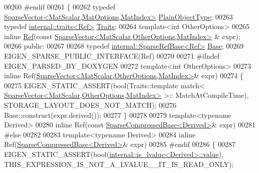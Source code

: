 \begin{DoxyCode}
00260 \textcolor{preprocessor}{#endif}
00261 \{
00262     \textcolor{keyword}{typedef} \hyperlink{group___sparse_core___module_class_eigen_1_1_sparse_vector}{SparseVector<MatScalar,MatOptions,MatIndex>} 
      \hyperlink{group___sparse_core___module_class_eigen_1_1_sparse_vector}{PlainObjectType};
00263     \textcolor{keyword}{typedef} \hyperlink{struct_eigen_1_1internal_1_1traits}{internal::traits<Ref>} \hyperlink{struct_eigen_1_1internal_1_1traits}{Traits};
00264     \textcolor{keyword}{template}<\textcolor{keywordtype}{int} OtherOptions>
00265     \textcolor{keyword}{inline} \hyperlink{group___core___module_class_eigen_1_1_ref}{Ref}(\textcolor{keyword}{const} \hyperlink{group___sparse_core___module_class_eigen_1_1_sparse_vector}{SparseVector<MatScalar,OtherOptions,MatIndex>}
      & expr);
00266   \textcolor{keyword}{public}:
00267 
00268     \textcolor{keyword}{typedef} \hyperlink{class_eigen_1_1internal_1_1_sparse_ref_base}{internal::SparseRefBase<Ref>} \hyperlink{class_eigen_1_1internal_1_1_sparse_ref_base}{Base};
00269     EIGEN\_SPARSE\_PUBLIC\_INTERFACE(Ref)
00270 
00271     \textcolor{preprocessor}{#ifndef EIGEN\_PARSED\_BY\_DOXYGEN}
00272     \textcolor{keyword}{template}<\textcolor{keywordtype}{int} OtherOptions>
00273     \textcolor{keyword}{inline} Ref(\hyperlink{group___sparse_core___module_class_eigen_1_1_sparse_vector}{SparseVector<MatScalar,OtherOptions,MatIndex>}& 
      expr)
00274     \{
00275       EIGEN\_STATIC\_ASSERT(\textcolor{keywordtype}{bool}(Traits::template match<
      \hyperlink{group___sparse_core___module_class_eigen_1_1_sparse_vector}{SparseVector<MatScalar,OtherOptions,MatIndex>} >::
      MatchAtCompileTime), STORAGE\_LAYOUT\_DOES\_NOT\_MATCH);
00276       Base::construct(expr.derived());
00277     \}
00278 
00279     \textcolor{keyword}{template}<\textcolor{keyword}{typename} Derived>
00280     \textcolor{keyword}{inline} Ref(\textcolor{keyword}{const} \hyperlink{group___sparse_core___module_class_eigen_1_1_sparse_compressed_base}{SparseCompressedBase<Derived>}& expr)
00281     \textcolor{preprocessor}{#else}
00282 
00283     \textcolor{keyword}{template}<\textcolor{keyword}{typename} Derived>
00284     \textcolor{keyword}{inline} Ref(\hyperlink{group___sparse_core___module_class_eigen_1_1_sparse_compressed_base}{SparseCompressedBase<Derived>}& expr)
00285     \textcolor{preprocessor}{#endif}
00286     \{
00287       EIGEN\_STATIC\_ASSERT(\textcolor{keywordtype}{bool}(\hyperlink{struct_eigen_1_1internal_1_1is__lvalue}{internal::is\_lvalue<Derived>::value}), 
      THIS\_EXPRESSION\_IS\_NOT\_A\_LVALUE\_\_IT\_IS\_READ\_ONLY);

\end{DoxyCode}
